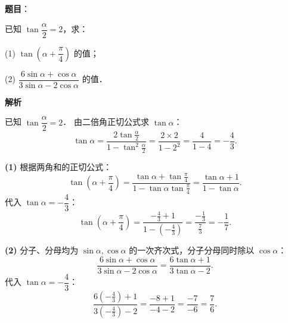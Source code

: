 \begin{answer}

\textbf{题目}：

已知 $\tan\dfrac{\alpha}{2} = 2$，求：

(1) $\tan\left(\alpha + \dfrac{\pi}{4}\right)$ 的值；

(2) $\dfrac{6\sin\alpha + \cos\alpha}{3\sin\alpha - 2\cos\alpha}$ 的值．

\textbf{解析}

已知 $\tan\dfrac{\alpha}{2} = 2$．
由二倍角正切公式求 $\tan\alpha$：
\nopagebreak[4]
\[
\tan\alpha = \frac{2\tan\frac{\alpha}{2}}{1 - \tan^2\frac{\alpha}{2}} = \frac{2 \times 2}{1 - 2^2} = \frac{4}{1 - 4} = -\frac{4}{3}.
\]

\textbf{(1)}
根据两角和的正切公式：
\nopagebreak[4]
\[
\tan\left(\alpha + \frac{\pi}{4}\right) = \frac{\tan\alpha + \tan\frac{\pi}{4}}{1 - \tan\alpha \tan\frac{\pi}{4}} = \frac{\tan\alpha + 1}{1 - \tan\alpha}.
\]
代入 $\tan\alpha = -\dfrac{4}{3}$：
\nopagebreak[4]
\[
\tan\left(\alpha + \frac{\pi}{4}\right) = \frac{-\frac{4}{3} + 1}{1 - \left(-\frac{4}{3}\right)} = \frac{-\frac{1}{3}}{\frac{7}{3}} = -\frac{1}{7}.
\]

\textbf{(2)}
分子、分母均为 $\sin\alpha, \cos\alpha$ 的一次齐次式，分子分母同时除以 $\cos\alpha$：
\nopagebreak[4]
\[
\frac{6\sin\alpha + \cos\alpha}{3\sin\alpha - 2\cos\alpha} = \frac{6\tan\alpha + 1}{3\tan\alpha - 2}.
\]
代入 $\tan\alpha = -\dfrac{4}{3}$：
\nopagebreak[4]
\[
\frac{6\left(-\frac{4}{3}\right) + 1}{3\left(-\frac{4}{3}\right) - 2} = \frac{-8 + 1}{-4 - 2} = \frac{-7}{-6} = \frac{7}{6}.
\]



\end{answer}
